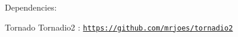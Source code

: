 Dependencies\-:

Tornado Tornadio2 \-: \href{https://github.com/mrjoes/tornadio2}{\tt https\-://github.\-com/mrjoes/tornadio2} 